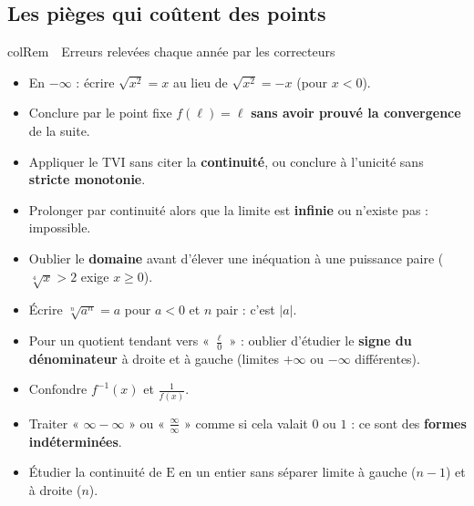 \documentclass[11pt,a4paper]{article}
\newenvironment{remarque}[1][Remarque]
  {\begin{fiche}{colRem}{\ding{43}~~#1}}{\end{fiche}}
\newcommand{\E}{\mathrm{E}}
\begin{document}
\subsection{Les pièges qui coûtent des points}

\begin{remarque}[Erreurs relevées chaque année par les correcteurs]
\begin{itemize}[leftmargin=6mm, itemsep=0.5mm]
  \item En $-\infty$ : écrire $\sqrt{x^2} = x$ au lieu de $\sqrt{x^2} = -x$ (pour $x < 0$).
  \item Conclure par le point fixe $f(\ell) = \ell$ \textbf{sans avoir prouvé la convergence} de la suite.
  \item Appliquer le TVI sans citer la \textbf{continuité}, ou conclure à l'unicité sans \textbf{stricte monotonie}.
  \item Prolonger par continuité alors que la limite est \textbf{infinie} ou n'existe pas : impossible.
  \item Oublier le \textbf{domaine} avant d'élever une inéquation à une puissance paire ($\sqrt[4]{x} > 2$ exige $x \geq 0$).
  \item Écrire $\sqrt[n]{a^n} = a$ pour $a < 0$ et $n$ pair : c'est $|a|$.
  \item Pour un quotient tendant vers « $\frac{\ell}{0}$ » : oublier d'étudier le \textbf{signe du dénominateur} à droite et à gauche (limites $+\infty$ ou $-\infty$ différentes).
  \item Confondre $f^{-1}(x)$ et $\frac{1}{f(x)}$.
  \item Traiter « $\infty - \infty$ » ou « $\frac{\infty}{\infty}$ » comme si cela valait $0$ ou $1$ : ce sont des \textbf{formes indéterminées}.
  \item Étudier la continuité de $\E$ en un entier sans séparer limite à gauche ($n - 1$) et à droite ($n$).
\end{itemize}
\end{remarque}
\end{document}
